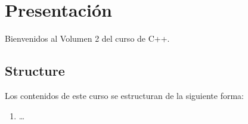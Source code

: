 \chapter*{Presentación}

Bienvenidos al Volumen 2 del curso de C++.


\section*{Structure}

Los contenidos de este curso se estructuran de la siguiente forma:

\begin{enumerate}

\item \ldots

\end{enumerate}
